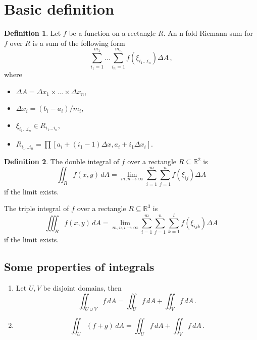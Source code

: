 \documentclass[
]{book}
\theoremstyle{definition}
\newtheorem{definition}{Definition}[chapter]
\theoremstyle{definition}
\theoremstyle{definition}
\theoremstyle{definition}
\theoremstyle{remark}
\begin{document}
\hypertarget{basic-definition}{%
\section{Basic definition}\label{basic-definition}}

\begin{definition}

Let \(f\) be a function on a rectangle \(R\).
An n-fold Riemann sum for \(f\) over \(R\) is a sum of the following form
\begin{equation*}
 \sum_{i_1=1}^{m_1}\dots \sum_{i_n=1}^{m_n} f(\xi_{i_1\dots i_n}) \Delta A \,,
\end{equation*}
where

\begin{itemize}
\item
  \(\Delta A = \Delta x_1\times\dots \times \Delta x_n\),
\item
  \(\Delta x_i = (b_i-a_i)/m_i\),
\item
  \(\xi_{i_1\dots i_n}\in R_{i_1\dots i_n}\),
\item
  \(R_{i_1\dots i_n}= \prod [a_i + (i_1-1)\Delta x, a_i+ i_1\Delta x_i]\).
\end{itemize}

\end{definition}

\begin{definition}
The double integral of \(f\) over a rectangle \(R \subseteq \mathbb{R}^2\) is
\begin{equation*}
    \iint_{R} f(x,y) \, dA = \lim_{m,n\to \infty} \sum_{i=1}^m \sum_{j=1}^n f(\xi_{ij}) \Delta A 
\end{equation*}
if the limit exists.

The triple integral of \(f\) over a rectangle \(R \subseteq \mathbb{R}^3\) is
\begin{equation*}
    \iiint_{R} f(x,y) \, dA = \lim_{m,n,l\to \infty} \sum_{i=1}^m \sum_{j=1}^n \sum_{k=1}^l f(\xi_{ijk}) \Delta A 
\end{equation*}
if the limit exists.
\end{definition}

\hypertarget{some-properties-of-integrals}{%
\subsection{Some properties of integrals}\label{some-properties-of-integrals}}

\begin{enumerate}
\def\labelenumi{\arabic{enumi}.}
\item
  Let \(U, V\) be disjoint domains, then
  \begin{equation*}
  \iint_{U \cup V} f \, dA = \iint_U f \, dA + \iint_V f\, dA \,. 
  \end{equation*}
\item
  \begin{equation*}
   \iint_U (f + g) \, dA = \iint_U f \, dA + \iint_V f \, dA \,.
  \end{equation*}
\end{enumerate}
\end{document}
